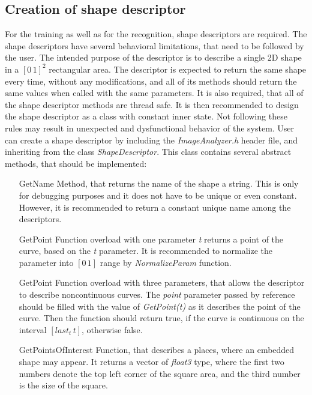 \subsection{Creation of shape descriptor}
For the training as well as for the recognition, shape descriptors are required. The shape descriptors have several behavioral limitations, that need to be followed by the user. The intended purpose of the descriptor is to describe a single 2D shape in a $[0\,1]^2$ rectangular area. The descriptor is expected to return the same shape every time, without any modifications, and all of its methods should return the same values when called with the same parameters. It is also required, that all of the shape descriptor methods are thread safe. It is then recommended to design the shape descriptor as a class with constant inner state. Not following these rules may result in unexpected and dysfunctional behavior of the system. User can create a shape descriptor by including the \emph{ImageAnalyzer.h} header file, and inheriting from the class \emph{ShapeDescriptor}. This class contains several abstract methods, that should be implemented:
\begin{enumerate}
\item [GetName] Method, that returns the name of the shape a string. This is only for debugging purposes and it does not have to be unique or even constant. However, it is recommended to return a constant unique name among the descriptors.

\item [GetPoint] Function overload with one parameter \emph{t} returns a point of the curve, based on the \emph{t} parameter. It is recommended to normalize the parameter into $[0\,1]$ range by \emph{NormalizeParam} function.

\item [GetPoint] Function overload with three parameters, that allows the descriptor to describe noncontinuous curves. The \emph{point} parameter passed by reference should be filled with the value of \emph{GetPoint(t)} as it describes the point of the curve. Then the function should return true, if the curve is continuous on the interval $[last_t\, t]$, otherwise false.

\item [GetPointsOfInterest] Function, that describes a places, where an embedded shape may appear. It returns a vector of \emph{float3} type, where the first two numbers denote the top left corner of the square area, and the third number is the size of the square.
\end{enumerate}

